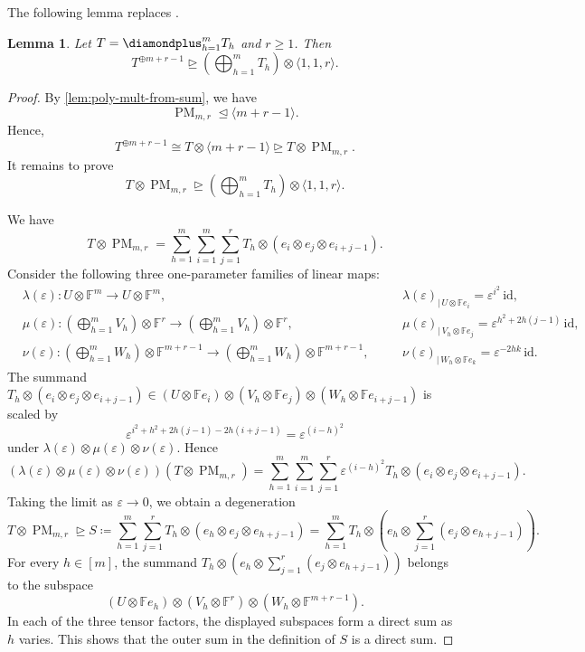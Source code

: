 \documentclass[11pt,letterpaper]{article}
\newtheorem{lemma}[theorem]{Lemma}\AddToHook{env/lemma/begin}{\crefalias{theorem}{lemma}}
\numberwithin{equation}{section}
\newcommand{\FF}{\mathbb{F}}
\DeclareMathOperator{\PM}{PM}
\begin{document}
The following lemma replaces \cite[Proposition~3.1]{chatgpt-paper}.

\begin{lemma}
\label{lem:diamond-plus-deg}
Let $T=\diamondplus_{h=1}^{m} T_h$ and $r \geq 1$.
Then \[
 T^{\oplus m+r-1} \trianglerighteq \left(\bigoplus_{h=1}^{m} T_h \right) \otimes \langle 1,1,r\rangle.
\]
\end{lemma}
\begin{proof}
By \cref{lem:poly-mult-from-sum}, we have \[
\PM_{m,r}\trianglelefteq \langle m+r-1\rangle.
\] Hence, \[
T^{\oplus m+r-1} \cong T \otimes \langle m+r-1\rangle \trianglerighteq T \otimes \PM_{m,r}.
\]
It remains to prove \[
T\otimes \PM_{m,r}\trianglerighteq \left(\bigoplus_{h=1}^{m} T_h \right) \otimes \langle 1,1,r\rangle.
\]

    We have \[
      T\otimes \PM_{m, r} = \sum_{h=1}^{m} \sum_{i=1}^{m}\sum_{j=1}^{r} T_h \otimes \left(e_i \otimes e_j\otimes e_{i+j-1}\right).
    \]
    Consider the following three one-parameter families of linear maps:
    \begin{align*}
      &\lambda(\varepsilon) \colon U \otimes \FF^m \to U \otimes \FF^m,\quad&
      &\lambda(\varepsilon)_{\mid\, U\otimes \mathbb{F} e_i} = \varepsilon^{i^2}\,\mathrm{id},
      \\
      &\mu(\varepsilon) \colon \left(\bigoplus_{h = 1}^{m} V_h\right) \otimes \FF^r \to \left(\bigoplus_{h = 1}^{m} V_h\right) \otimes \FF^r,\quad&
      &\mu(\varepsilon)_{\mid\, V_h \otimes \mathbb{F} e_j} = \varepsilon^{h^2 +2h(j-1)}\,\mathrm{id},
      \\
      &\nu(\varepsilon) \colon \left(\bigoplus_{h = 1}^{m} W_h \right) \otimes \FF^{m + r - 1} \to \left(\bigoplus_{h = 1}^{m} W_h \right) \otimes \FF^{m + r - 1}, \quad&
      &\nu(\varepsilon)_{\mid\, W_h\otimes \mathbb{F} e_k} =\varepsilon^{-2hk}\,\mathrm{id}.
    \end{align*}
  The summand $T_h \otimes \left(e_i \otimes e_j \otimes e_{i + j-1}\right)\in (U {\otimes} \mathbb{F}e_i) \otimes (V_h {\otimes} \mathbb{F}e_j) \otimes (W_h {\otimes} \mathbb{F}e_{i + j-1})$ is scaled by
\[
  \varepsilon^{i^2 + h^2 + 2h(j-1) - 2h(i+j-1)} = \varepsilon^{(i-h)^2}
\]
under $\lambda(\varepsilon) \otimes \mu(\varepsilon) \otimes \nu(\varepsilon)$.
Hence \[
  (\lambda(\varepsilon) \otimes \mu(\varepsilon) \otimes \nu(\varepsilon))(T\otimes \PM_{m,r}) = \sum_{h=1}^{m} \sum_{i=1}^{m} \sum_{j=1}^{r}\varepsilon^{(i-h)^2} T_h \otimes (e_i \otimes e_j \otimes e_{i+j-1}).
\]
Taking the limit as $\varepsilon\rightarrow 0$, we obtain a degeneration \[
  T \otimes \PM_{m,r} \trianglerighteq S \coloneqq \sum_{h=1}^{m} \sum_{j=1}^{r} T_h \otimes (e_h \otimes e_j \otimes e_{h + j-1}) = \sum_{h=1}^{m} T_h \otimes (e_h \otimes \sum_{j = 1}^{r} (e_j \otimes e_{h + j-1})).
\]
  For every $h \in [m]$, the summand $T_h \otimes (e_h \otimes \sum_{j = 1}^{r} (e_j \otimes e_{h + j-1}))$ belongs to the subspace
  \[
    \left( U \otimes \FF e_h\right) \otimes \left(V_h \otimes \FF^r \right)\otimes \left(W_h \otimes \FF^{m+r - 1} \right).
  \]
  In each of the three tensor factors, the displayed subspaces form a direct sum as $h$ varies.
This shows that the outer sum in the definition of $S$ is a direct sum.


\end{proof}
\end{document}
